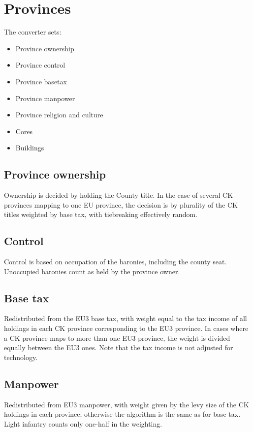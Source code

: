 \documentclass[12pt,ebook,oneside]{book}
\begin{document}
\chapter{Provinces}
The converter sets:
\begin{itemize}
\item Province ownership
\item Province control
\item Province basetax
\item Province manpower 
\item Province religion and culture
\item Cores
\item Buildings
\end{itemize}

\section{Province ownership}

Ownership is decided by holding the County title. In the case
of several CK provinces mapping to one EU province, the decision
is by plurality of the CK titles weighted by base tax, with 
tiebreaking effectively random.

\section{Control}

Control is based on occupation of the baronies, including the
county seat. Unoccupied baronies count as held by the province 
owner. 

\section{Base tax}

Redistributed from the EU3 base tax, with weight equal to
the tax income of all holdings in each CK province corresponding
to the EU3 province. In cases where a CK province maps to more
than one EU3 province, the weight is divided equally between the
EU3 ones. Note that the tax income is not adjusted for technology. 

\section{Manpower}

Redistributed from EU3 manpower, with weight given by the levy
size of the CK holdings in each province; otherwise the algorithm
is the same as for base tax. Light infantry counts only
one-half in the weighting. 
\end{document}
